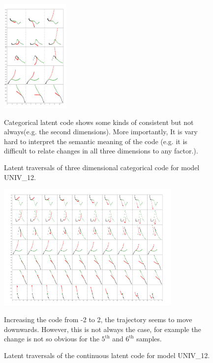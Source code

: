 \begin{figure}[b]
  \centering
  \includegraphics[width=0.3\textwidth]{figures/disc_interpolations_code0_batch2.jpeg}
  \caption{Latent traversals of three dimensional categorical code for model UNIV\_12. }{Categorical latent code shows some kinds of consistent but not always(e.g. the second dimensions). More importantly, It is vary hard to  interpret the semantic meaning of the code (e.g. it is difficult to relate changes in all three dimensions to any factor.).}
  \label{disc_code}
\end{figure}

\begin{figure}[ht]
  \centering
  \includegraphics[width=0.8\textwidth]{figures/cont_interpolations_code0_batch2.jpeg}
  \caption{Latent traversals of the continuous latent code for model UNIV\_12. }{Increasing the code from -2 to 2, the trajectory seems to move downwards. However, this is not always the case, for example the change is not so obvious for the $5^{\text{th}}$ and $6^{\text{th}}$ samples.}
  \label{cont_code}
\end{figure}



